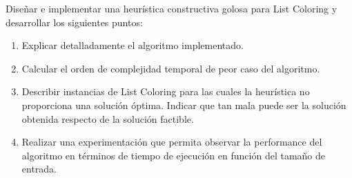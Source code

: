 Diseñar e implementar una heurística constructiva golosa para List Coloring y desarrollar los siguientes puntos:

\begin{enumerate}
\item Explicar detalladamente el algoritmo implementado.
\item Calcular el orden de complejidad temporal de peor caso del algoritmo.
\item Describir instancias de List Coloring para las cuales la heurística no proporciona una solución óptima. Indicar que tan mala puede ser la solución obtenida respecto de la solución factible.
\item Realizar una experimentación que permita observar la performance del algoritmo en términos de tiempo de ejecución en función del tamaño de entrada.
\end{enumerate}


